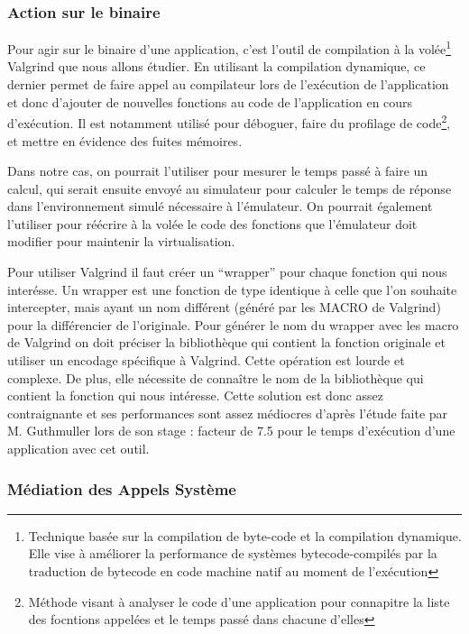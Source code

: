 \subsubsection{Action sur le binaire}
Pour agir sur le binaire d'une application, c'est l'outil de compilation à la volée\footnote{Technique basée sur la compilation de byte-code et la compilation dynamique. Elle vise à améliorer la performance de systèmes bytecode-compilés par la traduction de bytecode en code machine natif au moment de l'exécution} Valgrind\cite{INTERCEPTION:Valgrind, INTERCEPTION:Valgrind_web} que nous allons étudier. En utilisant la compilation dynamique, ce dernier permet de faire appel au compilateur lors de l'exécution de l'application et donc d'ajouter de nouvelles fonctions au code de l'application en cours d'exécution. Il est notamment utilisé pour déboguer, faire du profilage de code\footnote{Méthode visant à analyser le code d'une application pour connapitre la liste des focntions appelées et le temps passé dans chacune d'elles}, et mettre en évidence des fuites mémoires.

Dans notre cas, on pourrait l'utiliser pour mesurer le temps passé à faire un calcul, qui serait ensuite envoyé au simulateur pour calculer le temps de réponse dans l'environnement simulé nécessaire à l'émulateur. On pourrait également l'utiliser pour réécrire à la volée le code des fonctions que l'émulateur doit modifier pour maintenir la virtualisation.

Pour utiliser Valgrind il faut créer un ``wrapper'' pour chaque fonction qui nous interésse. Un wrapper est une fonction de type identique à celle que l'on souhaite intercepter, mais ayant un nom différent (généré par les MACRO de Valgrind) pour la différencier de l'originale. Pour générer le nom du wrapper avec les macro de Valgrind on doit préciser la bibliothèque qui contient la fonction originale et utiliser un encodage spécifique à Valgrind. Cette opération est lourde et complexe. De plus, elle nécessite de connaître le nom de la bibliothèque qui contient la fonction qui nous intéresse. Cette solution est donc assez contraignante et ses performances sont assez médiocres d'après l'étude faite par M. Guthmuller lors de son stage \cite{INTERCEPTION:MARION}: facteur de 7.5 pour le temps d'exécution d'une application avec cet outil.
    

\subsubsection{Médiation des Appels Système}

